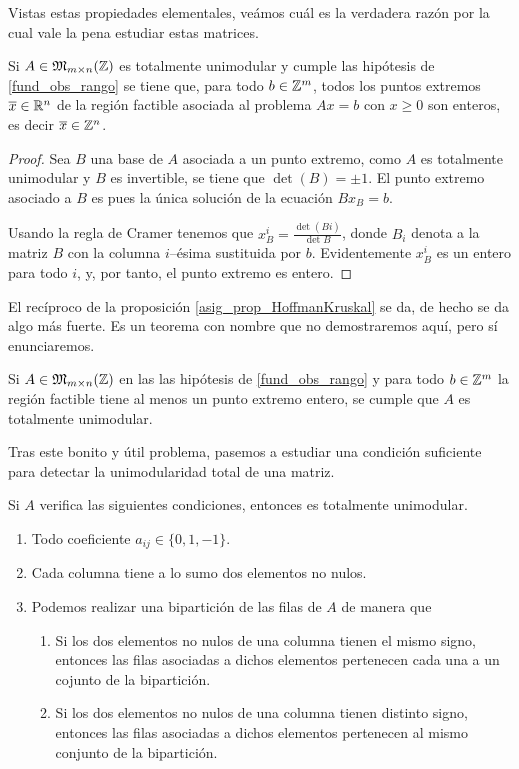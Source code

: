 Vistas estas propiedades elementales, veámos cuál es la verdadera razón por la cual vale la pena estudiar estas matrices.
\begin{prop}\label{asig_prop_HoffmanKruskal}
	Si $A\in\mathfrak{M}_{m\times n}(\mathbb{Z})$ es totalmente unimodular y cumple las hipótesis de \ref{fund_obs_rango} se tiene que, para todo $b\in\mathbb{Z}^m$, todos los puntos extremos $\overline{x}\in\mathbb{R}^n$ de la región factible asociada al problema $Ax=b$ con $x\geq 0$ son enteros, es decir $\overline{x}\in\mathbb{Z}^n$.
\end{prop}
\begin{proof}
	Sea $B$ una base de $A$ asociada a un punto extremo, como $A$ es totalmente unimodular y $B$ es invertible, se tiene que $\det(B)=\pm1$. El punto extremo asociado a $B$ es pues la única solución de la ecuación $Bx_B=b$.
	
	Usando la regla de Cramer tenemos que $x_B^i=\frac{\det(Bi)}{\det B}$, donde $B_i$ denota a la matriz $B$ con la columna $i$--ésima sustituida por $b$. Evidentemente $x_B^i$ es un entero para todo $i$, y, por tanto, el punto extremo es entero.
\end{proof}
El recíproco de la proposición \ref{asig_prop_HoffmanKruskal} se da, de hecho se da algo más fuerte. Es un teorema con nombre que no demostraremos aquí, pero sí enunciaremos.
\begin{theo}
	Si $A\in\mathfrak{M}_{m\times n}(\mathbb{Z})$ en las las hipótesis de \ref{fund_obs_rango} y para todo $b\in \mathbb{Z}^m$ la región factible tiene al menos un punto extremo entero, se cumple que $A$ es totalmente unimodular.
\end{theo}
Tras este bonito y útil problema, pasemos a estudiar una condición suficiente para detectar la unimodularidad total de una matriz.
\begin{prop}\label{asig_prop_condicionSuficienteUnim}
	Si $A$ verifica las siguientes condiciones, entonces es totalmente unimodular.
	\begin{enumerate}
		\item Todo coeficiente $a_{ij}\in\{0,1,-1\}$.
		\item Cada columna tiene a lo sumo dos elementos no nulos.
		\item Podemos realizar una bipartición de las filas de $A$ de manera que
		\begin{enumerate}
			\item Si los dos elementos no nulos de una columna tienen el mismo signo, entonces las filas asociadas a dichos elementos pertenecen cada una a un cojunto de la bipartición.
			\item Si los dos elementos no nulos de una columna tienen distinto signo, entonces las filas asociadas a dichos elementos pertenecen al mismo conjunto de la bipartición.
		\end{enumerate} 
	\end{enumerate}
\end{prop}
